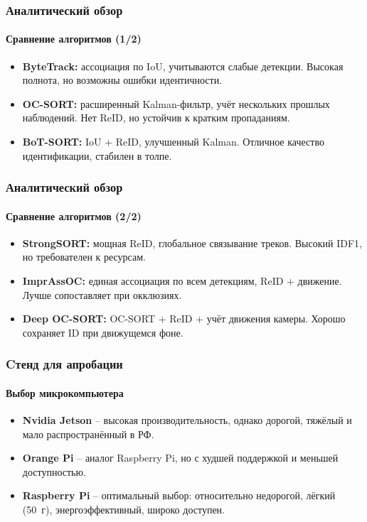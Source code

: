 \documentclass{beamer} %
\begin{document}
\begin{frame}
  \frametitle{Аналитический обзор}
  \framesubtitle{Сравнение алгоритмов (1/2)}
  \begin{itemize}
    \item \textbf{ByteTrack:} ассоциация по IoU, учитываются слабые детекции. Высокая полнота, но возможны ошибки идентичности.
    \item \textbf{OC-SORT:} расширенный Kalman-фильтр, учёт нескольких прошлых наблюдений. Нет ReID, но устойчив к кратким пропаданиям.
    \item \textbf{BoT-SORT:} IoU + ReID, улучшенный Kalman. Отличное качество идентификации, стабилен в толпе.
  \end{itemize}
\end{frame}
\begin{frame}
  \frametitle{Аналитический обзор}
  \framesubtitle{Сравнение алгоритмов (2/2)}
  \begin{itemize}
    \item \textbf{StrongSORT:} мощная ReID, глобальное связывание треков. Высокий IDF1, но требователен к ресурсам.
    \item \textbf{ImprAssOC:} единая ассоциация по всем детекциям, ReID + движение. Лучше сопоставляет при окклюзиях.
    \item \textbf{Deep OC-SORT:} OC-SORT + ReID + учёт движения камеры. Хорошо сохраняет ID при движущемся фоне.
  \end{itemize}
\end{frame}

\begin{frame}
  \frametitle{Cтенд для апробации}
  \framesubtitle{Выбор микрокомпьютера}
  \begin{itemize}
      \item \textbf{Nvidia Jetson} – высокая производительность, однако дорогой, тяжёлый и мало распространённый в РФ.
      \item \textbf{Orange Pi} – аналог Raspberry Pi, но с худшей поддержкой и меньшей доступностью.
      \item \textbf{Raspberry Pi} – оптимальный выбор: относительно недорогой, лёгкий (50 г), энергоэффективный, широко доступен.
  \end{itemize}
\end{frame}
\end{document}
